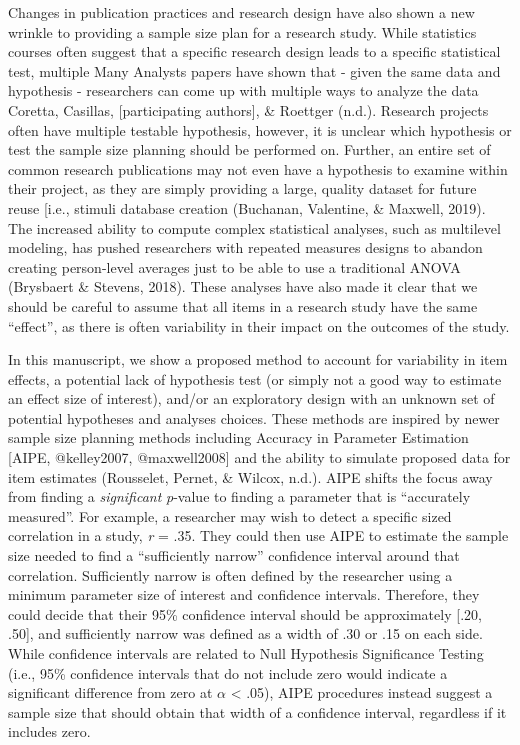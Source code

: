 \documentclass[
  man]{apa6}
\begin{document}
Changes in publication practices and research design have also shown a new wrinkle to providing a sample size plan for a research study. While statistics courses often suggest that a specific research design leads to a specific statistical test, multiple Many Analysts papers have shown that - given the same data and hypothesis - researchers can come up with multiple ways to analyze the data Coretta, Casillas, {[}participating authors{]}, \& Roettger (n.d.). Research projects often have multiple testable hypothesis, however, it is unclear which hypothesis or test the sample size planning should be performed on. Further, an entire set of common research publications may not even have a hypothesis to examine within their project, as they are simply providing a large, quality dataset for future reuse {[}i.e., stimuli database creation (Buchanan, Valentine, \& Maxwell, 2019). The increased ability to compute complex statistical analyses, such as multilevel modeling, has pushed researchers with repeated measures designs to abandon creating person-level averages just to be able to use a traditional ANOVA (Brysbaert \& Stevens, 2018). These analyses have also made it clear that we should be careful to assume that all items in a research study have the same ``effect'', as there is often variability in their impact on the outcomes of the study.

In this manuscript, we show a proposed method to account for variability in item effects, a potential lack of hypothesis test (or simply not a good way to estimate an effect size of interest), and/or an exploratory design with an unknown set of potential hypotheses and analyses choices. These methods are inspired by newer sample size planning methods including Accuracy in Parameter Estimation {[}AIPE, @kelley2007, @maxwell2008{]} and the ability to simulate proposed data for item estimates (Rousselet, Pernet, \& Wilcox, n.d.). AIPE shifts the focus away from finding a \emph{significant} \emph{p}-value to finding a parameter that is ``accurately measured''. For example, a researcher may wish to detect a specific sized correlation in a study, \emph{r} = .35. They could then use AIPE to estimate the sample size needed to find a ``sufficiently narrow'' confidence interval around that correlation. Sufficiently narrow is often defined by the researcher using a minimum parameter size of interest and confidence intervals. Therefore, they could decide that their 95\% confidence interval should be approximately {[}.20, .50{]}, and sufficiently narrow was defined as a width of .30 or .15 on each side. While confidence intervals are related to Null Hypothesis Significance Testing (i.e., 95\% confidence intervals that do not include zero would indicate a significant difference from zero at \(\alpha\) \textless{} .05), AIPE procedures instead suggest a sample size that should obtain that width of a confidence interval, regardless if it includes zero.
\end{document}
